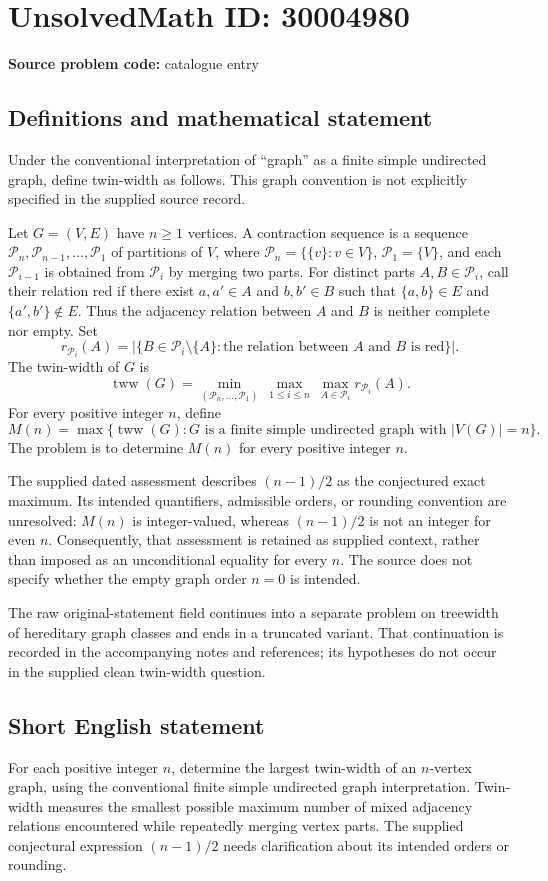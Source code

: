 \documentclass[11pt]{article}
\begin{document}
\section*{UnsolvedMath ID: 30004980}
\textbf{Source problem code:} catalogue entry
\subsection{Definitions and mathematical statement}
Under the conventional interpretation of ``graph'' as a finite simple undirected graph, define twin-width as follows. This graph convention is not explicitly specified in the supplied source record.

Let \(G=(V,E)\) have \(n\geq 1\) vertices. A contraction sequence is a sequence \(\mathcal P_n,\mathcal P_{n-1},\ldots,\mathcal P_1\) of partitions of \(V\), where \(\mathcal P_n=\{\{v\}:v\in V\}\), \(\mathcal P_1=\{V\}\), and each \(\mathcal P_{i-1}\) is obtained from \(\mathcal P_i\) by merging two parts. For distinct parts \(A,B\in\mathcal P_i\), call their relation red if there exist \(a,a'\in A\) and \(b,b'\in B\) such that \(\{a,b\}\in E\) and \(\{a',b'\}\notin E\). Thus the adjacency relation between \(A\) and \(B\) is neither complete nor empty. Set
\[
 r_{\mathcal P_i}(A)=\bigl|\{B\in\mathcal P_i\setminus\{A\}:\text{the relation between }A\text{ and }B\text{ is red}\}\bigr|.
\]
The twin-width of \(G\) is
\[
 \operatorname{tww}(G)=\min_{(\mathcal P_n,\ldots,\mathcal P_1)}\ \max_{1\leq i\leq n}\ \max_{A\in\mathcal P_i} r_{\mathcal P_i}(A).
\]
For every positive integer \(n\), define
\[
 M(n)=\max\{\operatorname{tww}(G):G\text{ is a finite simple undirected graph with }|V(G)|=n\}.
\]
The problem is to determine \(M(n)\) for every positive integer \(n\).

The supplied dated assessment describes \((n-1)/2\) as the conjectured exact maximum. Its intended quantifiers, admissible orders, or rounding convention are unresolved: \(M(n)\) is integer-valued, whereas \((n-1)/2\) is not an integer for even \(n\). Consequently, that assessment is retained as supplied context, rather than imposed as an unconditional equality for every \(n\). The source does not specify whether the empty graph order \(n=0\) is intended.

The raw original-statement field continues into a separate problem on treewidth of hereditary graph classes and ends in a truncated variant. That continuation is recorded in the accompanying notes and references; its hypotheses do not occur in the supplied clean twin-width question.
\subsection{Short English statement}
For each positive integer \(n\), determine the largest twin-width of an \(n\)-vertex graph, using the conventional finite simple undirected graph interpretation. Twin-width measures the smallest possible maximum number of mixed adjacency relations encountered while repeatedly merging vertex parts. The supplied conjectural expression \((n-1)/2\) needs clarification about its intended orders or rounding.
\end{document}
